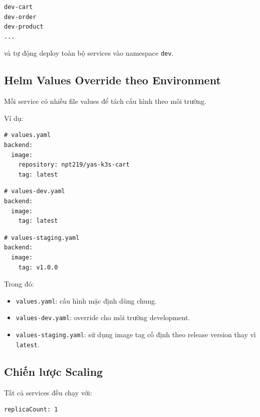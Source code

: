\begin{verbatim}
dev-cart
dev-order
dev-product
...
\end{verbatim}

và tự động deploy toàn bộ services vào namespace \texttt{dev}.

\vspace{0.5em}

\subsection{Helm Values Override theo Environment}

Mỗi service có nhiều file values để tách cấu hình theo môi trường.

Ví dụ:

\begin{verbatim}
# values.yaml
backend:
  image:
    repository: npt219/yas-k3s-cart
    tag: latest
\end{verbatim}

\begin{verbatim}
# values-dev.yaml
backend:
  image:
    tag: latest
\end{verbatim}

\begin{verbatim}
# values-staging.yaml
backend:
  image:
    tag: v1.0.0
\end{verbatim}

Trong đó:
\begin{itemize}
    \item \texttt{values.yaml}: cấu hình mặc định dùng chung.
    
    \item \texttt{values-dev.yaml}: override cho môi trường development.
    
    \item \texttt{values-staging.yaml}: sử dụng image tag cố định theo release version thay vì \texttt{latest}.
\end{itemize}

\vspace{0.5em}


\subsection{Chiến lược Scaling}

Tất cả services đều chạy với:

\begin{verbatim}
replicaCount: 1
\end{verbatim}

